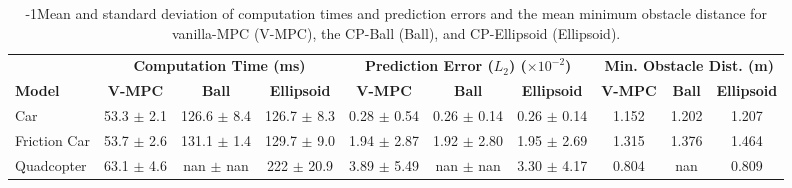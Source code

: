 \documentclass{l4dc2026}
\begin{document}
\vspace{-4pt}
\begin{table}[h]
    \centering
  { %
  \footnotesize  
  \centering
  \caption{\looseness-1Mean and standard deviation of computation times and prediction errors and the mean minimum obstacle distance for vanilla-MPC (V-MPC), the CP-Ball (Ball), and CP-Ellipsoid (Ellipsoid). }\vspace{-10pt}
  \label{tab:combined_results_modified}
  \setlength{\tabcolsep}{2pt} %
  \begin{tabular}{@{}lccccccccc@{}}
    \toprule
    & \multicolumn{3}{c}{\textbf{Computation Time (ms)}} 
    & \multicolumn{3}{c}{\textbf{Prediction Error ($L_2$) ($\times 10^{-2}$)}} 
    & \multicolumn{3}{c}{\textbf{Min. Obstacle Dist. (m)}} \\
    \cmidrule(lr){2-4} \cmidrule(lr){5-7} \cmidrule(lr){8-10}
    \textbf{Model} 
    & \textbf{V-MPC} & \textbf{Ball} & \textbf{Ellipsoid} 
    & \textbf{V-MPC} & \textbf{Ball} & \textbf{Ellipsoid} 
    & \textbf{V-MPC} & \textbf{Ball} & \textbf{Ellipsoid} \\
    \midrule
    
    
    Car 
    & 53.3 $\pm$ 2.1 & 126.6 $\pm$ 8.4 & 126.7 $\pm$ 8.3 
    & 0.28 $\pm$ 0.54 & 0.26 $\pm$ 0.14 & 0.26 $\pm$ 0.14 
    & 1.152 & 1.202 & 1.207 \\
    
    Friction Car 
    & 53.7 $\pm$ 2.6 & 131.1 $\pm$ 1.4 & 129.7 $\pm$ 9.0 
    & 1.94 $\pm$ 2.87 & 1.92 $\pm$ 2.80 & 1.95 $\pm$ 2.69 
    & 1.315 & 1.376 & 1.464 \\
    
    Quadcopter 
    & 63.1 $\pm$ 4.6 & nan $\pm$ nan & 222 $\pm$ 20.9 
    & 3.89 $\pm$ 5.49 & nan $\pm$ nan & 3.30 $\pm$ 4.17 
    & 0.804 & nan & 0.809 \\
    \bottomrule
  \end{tabular}\vspace{-5pt}
  } %
\end{table}
\end{document}
